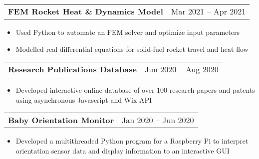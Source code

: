 \documentclass[a4paper,10pt]{article}
\begin{document}
\begin{tabularx}{\linewidth}{@{}X r@{}}
\begin{minipage}[t]{\linewidth}
  \textbf{FEM Rocket Heat \& Dynamics Model}
\end{minipage}
&     Mar 2021 -- Apr 2021
\end{tabularx}
\begin{itemize}[nosep,after=\strut, leftmargin=1em, itemsep=3pt,label=--]
  \item Used Python to automate an FEM solver and optimize input parameters
\item Modelled real differential equations for solid-fuel rocket travel and heat flow
\end{itemize}
\begin{tabularx}{\linewidth}{@{}X r@{}}
\begin{minipage}[t]{\linewidth}
  \textbf{Research Publications Database}
\end{minipage}
&     Jun 2020 -- Aug 2020
\end{tabularx}
\begin{itemize}[nosep,after=\strut, leftmargin=1em, itemsep=3pt,label=--]
  \item Developed interactive online database of over 100 research papers and patents using asynchronous Javascript and Wix API
\end{itemize}
\begin{tabularx}{\linewidth}{@{}X r@{}}
\begin{minipage}[t]{\linewidth}
  \textbf{Baby Orientation Monitor}
\end{minipage}
&     Jan 2020 -- Jun 2020
\end{tabularx}
\begin{itemize}[nosep,after=\strut, leftmargin=1em, itemsep=3pt,label=--]
  \item Developed a multithreaded Python program for a Raspberry Pi to interpret orientation sensor data and display information to an interactive GUI
\end{itemize}
\end{document}
